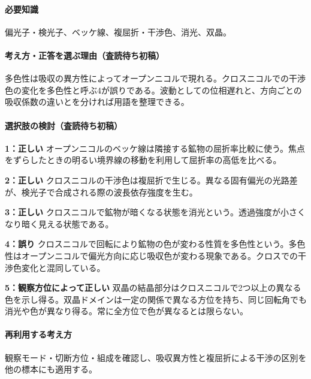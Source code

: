 \paragraph{必要知識} 偏光子・検光子、ベッケ線、複屈折・干渉色、消光、双晶。

\paragraph{考え方・正答を選ぶ理由（査読待ち初稿）} 多色性は吸収の異方性によってオープンニコルで現れる。クロスニコルでの干渉色の変化を多色性と呼ぶ4が誤りである。波動としての位相遅れと、方向ごとの吸収係数の違いとを分ければ用語を整理できる。

\paragraph{選択肢の検討（査読待ち初稿）}\mbox{}\par

\noindent\textbf{1：正しい} オープンニコルのベッケ線は隣接する鉱物の屈折率比較に使う。焦点をずらしたときの明るい境界線の移動を利用して屈折率の高低を比べる。\par

\noindent\textbf{2：正しい} クロスニコルの干渉色は複屈折で生じる。異なる固有偏光の光路差が、検光子で合成される際の波長依存強度を生む。\par

\noindent\textbf{3：正しい} クロスニコルで鉱物が暗くなる状態を消光という。透過強度が小さくなり暗く見える状態である。\par

\noindent\textbf{4：誤り} クロスニコルで回転により鉱物の色が変わる性質を多色性という。多色性はオープンニコルで偏光方向に応じ吸収色が変わる現象である。クロスでの干渉色変化と混同している。\par

\noindent\textbf{5：観察方位によって正しい} 双晶の結晶部分はクロスニコルで2つ以上の異なる色を示し得る。双晶ドメインは一定の関係で異なる方位を持ち、同じ回転角でも消光や色が異なり得る。常に全方位で色が異なるとは限らない。\par

\paragraph{再利用する考え方} 観察モード・切断方位・組成を確認し、吸収異方性と複屈折による干渉の区別を他の標本にも適用する。

